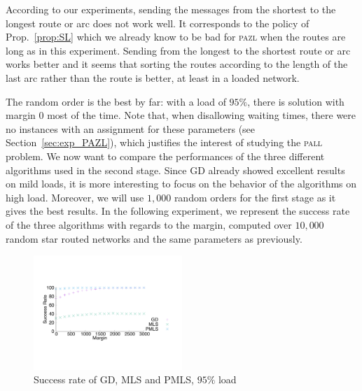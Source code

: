 \documentclass[10pt, conference, letterpaper]{IEEEtran}
\newcommand\pazl{\textsc{pazl}\xspace}
\newcommand\pall{\textsc{pall}\xspace}
\begin{document}
     
     According to our experiments, sending the messages from the shortest to the longest route or arc does not work well. It corresponds to the policy of Prop.~\ref{prop:SL} which we already know to be bad for \pazl when the routes are long as in this experiment. Sending from the longest to the shortest route or arc works better and it seems that sorting the routes according to the length of the last arc rather than the route is better, at least in a loaded network. 
     
     The random order is the best by far: with a load of $95\%$, there is solution with margin $0$ most of the time. Note that, when disallowing waiting times, there were no instances with an assignment for these parameters (see Section~\ref{sec:exp_PAZL}), which justifies the interest of studying the \pall problem. We now want to compare the performances of the three different algorithms used in the second stage. Since GD already showed excellent results on mild loads, it is more interesting to focus on the behavior of the algorithms on high load. Moreover, we will use $1,000$ random orders for the first stage as it gives the best results. In the following experiment, we represent the success rate of the three algorithms with regards to the margin,  computed over $10,000$ random star routed networks and the same parameters as previously.
     
    \begin{figure} [h] 
       \begin{center}
      \includegraphics[width=0.5\textwidth]{retour_21000.pdf}
      \end{center}
         \vspace{-0.5cm}
      \caption{Success rate of GD, MLS and PMLS, $95\%$ load}
     \label{fig:success21000}
     \end{figure}
\end{document}
